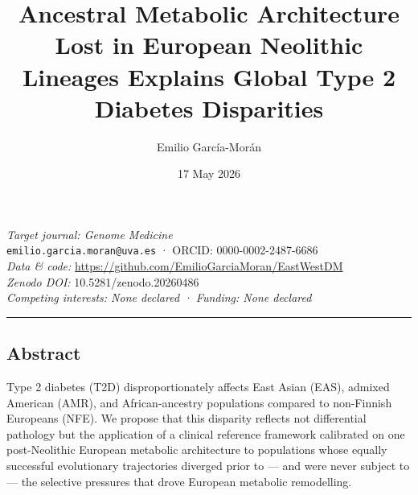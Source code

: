 \documentclass[
  letterpaper,
  DIV=11,
  numbers=noendperiod]{scrartcl}
\title{Ancestral Metabolic Architecture Lost in European Neolithic
Lineages Explains Global Type 2 Diabetes Disparities}
\author{Emilio García-Morán}
\date{17 May 2026}
\begin{document}
\maketitle


\thispagestyle{empty}

\vspace{1cm}

\begin{center}
\textcolor[HTML]{2E6DA4}{\textit{Target journal: Genome Medicine}}\\[0.3cm]
\texttt{emilio.garcia.moran@uva.es} \quad · \quad ORCID: 0000-0002-2487-6686\\[0.2cm]
\textit{Data \& code:} \url{https://github.com/EmilioGarciaMoran/EastWestDM}\\
\textit{Zenodo DOI:} 10.5281/zenodo.20260486\\[0.2cm]
\textcolor[HTML]{666666}{\textit{Competing interests: None declared · Funding: None declared}}
\end{center}

\hrule
\vspace{0.5cm}

\subsection*{Abstract}\label{abstract}

Type 2 diabetes (T2D) disproportionately affects East Asian (EAS),
admixed American (AMR), and African-ancestry populations compared to
non-Finnish Europeans (NFE). We propose that this disparity reflects not
differential pathology but the application of a clinical reference
framework calibrated on one post-Neolithic European metabolic
architecture to populations whose equally successful evolutionary
trajectories diverged prior to --- and were never subject to --- the
selective pressures that drove European metabolic remodelling.
\end{document}
